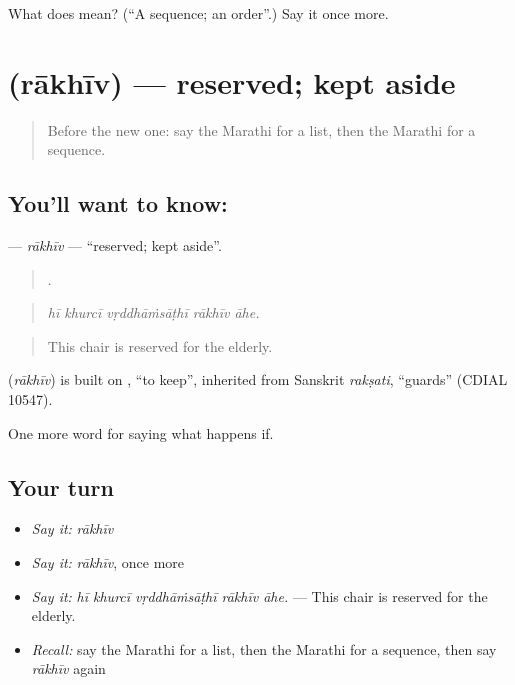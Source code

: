 \begin{tcolorbox}[breakable,colback=teal!4,colframe=teal!35!black,title={Before you move on}]
What does  mean? (\textquotedblleft{}A sequence; an order\textquotedblright{}.) Say it once more.
\end{tcolorbox}
\section[\texorpdfstring{\mr{राखीव} (rākhīv)}{राखीव (rākhīv)}]{ (rākhīv) — reserved; kept aside}

\label{lesson:MR-C551-rakhiv}



\begin{quote}
Before the new one: say the Marathi for a list, then the Marathi for a sequence.
\end{quote}

\subsection*{You'll want to know: }
\textbf{} — \emph{rākhīv} — \textquotedblleft{}reserved; kept aside\textquotedblright{}.

\begin{quote}
    .
\end{quote}

\begin{quote}
\emph{hī khurcī vṛddhāṁsāṭhī rākhīv āhe.}
\end{quote}

\begin{quote}
This chair is reserved for the elderly.
\end{quote}

\begin{cousinweb}
\textbf{} (\emph{rākhīv}) is built on , \textquotedblleft{}to keep\textquotedblright{}, inherited from Sanskrit \emph{rakṣati}, \textquotedblleft{}guards\textquotedblright{} (CDIAL 10547).
\end{cousinweb}

\begin{grammarlens}[title={What you've built}]
One more word for saying what happens if.
\end{grammarlens}

\subsection*{Your turn}
\begin{itemize}
\raggedright
  \item \emph{Say it:} \emph{rākhīv}
  \item \emph{Say it:} \emph{rākhīv}, once more
  \item \emph{Say it:} \emph{hī khurcī vṛddhāṁsāṭhī rākhīv āhe.} — This chair is reserved for the elderly.
  \item \emph{Recall:} say the Marathi for a list, then the Marathi for a sequence, then say \emph{rākhīv} again
\end{itemize}

